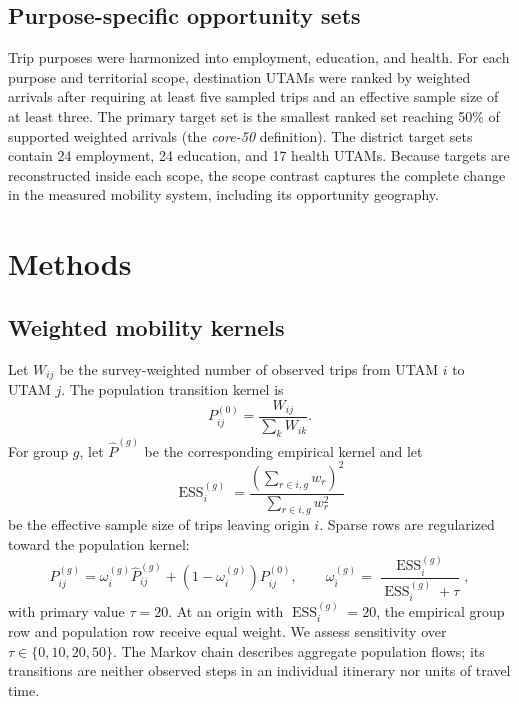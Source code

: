 \documentclass[11pt]{article}
\begin{document}
\subsection{Purpose-specific opportunity sets}
Trip purposes were harmonized into employment, education, and health. For each purpose and territorial scope, destination UTAMs were ranked by weighted arrivals after requiring at least five sampled trips and an effective sample size of at least three. The primary target set is the smallest ranked set reaching 50\% of supported weighted arrivals (the \emph{core-50} definition). The district target sets contain 24 employment, 24 education, and 17 health UTAMs. Because targets are reconstructed inside each scope, the scope contrast captures the complete change in the measured mobility system, including its opportunity geography.

\section{Methods}
\subsection{Weighted mobility kernels}
Let $W_{ij}$ be the survey-weighted number of observed trips from UTAM $i$ to UTAM $j$. The population transition kernel is
\begin{equation}
 P^{(0)}_{ij}=\frac{W_{ij}}{\sum_k W_{ik}}.
\end{equation}
For group $g$, let $\widehat P^{(g)}$ be the corresponding empirical kernel and let
\begin{equation}
 \operatorname{ESS}^{(g)}_i=\frac{(\sum_{r\in i,g}w_r)^2}{\sum_{r\in i,g}w_r^2}
\end{equation}
be the effective sample size of trips leaving origin $i$. Sparse rows are regularized toward the population kernel:
\begin{equation}
 P^{(g)}_{ij}=\omega^{(g)}_i\widehat P^{(g)}_{ij}+
 (1-\omega^{(g)}_i)P^{(0)}_{ij},\qquad
 \omega^{(g)}_i=\frac{\operatorname{ESS}^{(g)}_i}{\operatorname{ESS}^{(g)}_i+\tau},
\end{equation}
with primary value $\tau=20$. At an origin with $\operatorname{ESS}^{(g)}_i=20$, the empirical group row and population row receive equal weight. We assess sensitivity over $\tau\in\{0,10,20,50\}$. The Markov chain describes aggregate population flows; its transitions are neither observed steps in an individual itinerary nor units of travel time.
\end{document}
